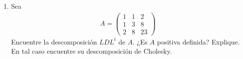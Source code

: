 \documentclass[11pt,letterpaper]{article}
\begin{document}
\begin{enumerate}
\item Sea 
\begin{align*}
A=\begin{pmatrix}
1 & 1 & 2 \\
1 & 3 & 8\\
2 & 8 & 23
\end{pmatrix}
\end{align*}
Encuentre la descomposición $LDL^t$ de $A$. ¿Es $A$ positiva definida? Explique. En tal caso encuentre su descomposición de Cholesky.


\end{enumerate}
\end{document}

